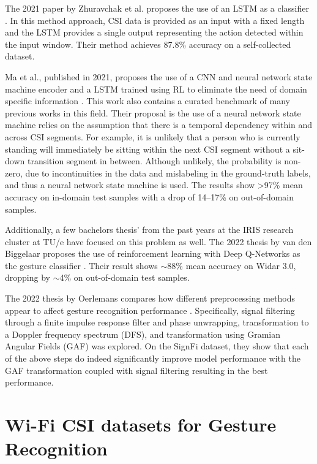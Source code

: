 The 2021 paper by Zhuravchak et al. proposes the use of an LSTM as a classifier \cite{zhuravchak2022human}. 
In this method approach, CSI data is provided as an input with a fixed length and the LSTM provides a single output representing the action detected within the input window.
Their method achieves 87.8\% accuracy on a self-collected dataset.

Ma et al., published in 2021, proposes the use of a CNN and neural network state machine encoder and a LSTM trained using RL to eliminate the need of domain specific information \cite{ma2021location}.
This work also contains a curated benchmark of many previous works in this field.
Their proposal is the use of a neural network state machine relies on the assumption that there is a temporal dependency within and across CSI segments.
For example, it is unlikely that a person who is currently standing will immediately be sitting within the next CSI segment without a sit-down transition segment in between.
Although unlikely, the probability is non-zero, due to incontinuities in the data and mislabeling in the ground-truth labels, and thus a neural network state machine is used.
The results show >97\% mean accuracy on in-domain test samples with a drop of 14--17\% on out-of-domain samples.

Additionally, a few bachelors thesis' from the past years at the IRIS research cluster at TU/e have focused on this problem as well.
The 2022 thesis by van den Biggelaar proposes the use of reinforcement learning with Deep Q-Networks as the gesture classifier \cite{biggelaar2022gesture}.
Their result shows $\sim$88\% mean accuracy on Widar 3.0, dropping by $\sim$4\% on out-of-domain test samples.

The 2022 thesis by Oerlemans compares how different preprocessing methods appear to affect gesture recognition performance \cite{oerlemans2022effect}.
Specifically, signal filtering through a finite impulse response filter and phase unwrapping, transformation to a Doppler frequency spectrum (DFS), and transformation using Gramian Angular Fields (GAF) was explored.
On the SignFi dataset, they show that each of the above steps do indeed significantly improve model performance with the GAF transformation coupled with signal filtering resulting in the best performance.

\section{Wi-Fi CSI datasets for Gesture Recognition}

